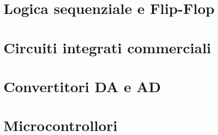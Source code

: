 \documentclass[12pt, a4paper]{report}
\begin{document}
\chapter{Logica sequenziale e Flip-Flop}
\chapter{Circuiti integrati commerciali}
\chapter{Convertitori DA e AD}
\chapter{Microcontrollori}

\begin{appendices}


\end{appendices}
\end{document}
